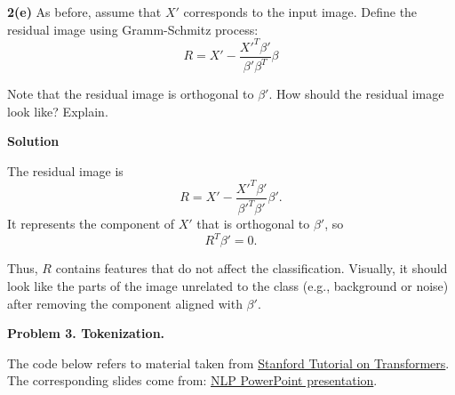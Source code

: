 \documentclass[10pt]{article}
\begin{document}
\textbf{2(e)} As before, assume that $X'$ corresponds to the input image. Define the residual image using Gramm-Schmitz process:
\[
R = X' - \frac{X'^T \beta'}{\beta' \beta^T}\beta
\]

Note that the residual image is orthogonal to $\beta'$. How should the residual image look like? Explain.

\textbf{Solution}

The residual image is
\[
R = X' - \frac{X'^T\beta'}{\beta'^T\beta'}\beta'.
\]
It represents the component of $X'$ that is orthogonal to $\beta'$, so
\[
R^T\beta' = 0.
\]

Thus, $R$ contains features that do not affect the classification. Visually, it should look like the parts of the image unrelated to the class (e.g., background or noise) after removing the component aligned with $\beta'$.

\newpage

\textbf{Problem 3. Tokenization.}

The code below refers to material taken from \href{https://colab.research.google.com/drive/1On-9_5LEUfJbNd3RNKE723sCWZRJeB7F?usp=sharing}{Stanford Tutorial on Transformers}. The corresponding slides come from: \href{https://docs.google.com/presentation/d/1HW0LdAc-qSF5za5Lyay201jB3sUM4PZs1agD8Wn2cUA/edit?slide=id.g3231418657f_0_259#slide=id.g3231418657f_0_259}{NLP PowerPoint presentation}.
\end{document}
